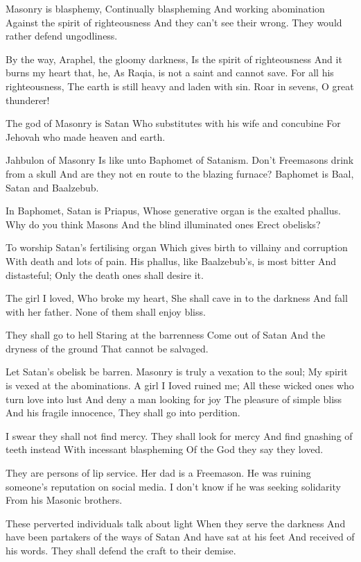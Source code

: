 \documentclass[
]{book}
\begin{document}
Masonry is blasphemy,
Continually blaspheming
And working abomination
Against the spirit of righteousness
And they can't see their wrong.
They would rather defend ungodliness.

By the way, Araphel, the gloomy darkness,
Is the spirit of righteousness
And it burns my heart that, he,
As Raqia, is not a saint and cannot save.
For all his righteousness,
The earth is still heavy and laden with sin.
Roar in sevens, O great thunderer!

The god of Masonry is Satan
Who substitutes with his wife and concubine
For Jehovah who made heaven and earth.

Jahbulon of Masonry
Is like unto Baphomet of Satanism.
Don't Freemasons drink from a skull
And are they not en route to the blazing furnace?
Baphomet is Baal, Satan and Baalzebub.

In Baphomet, Satan is Priapus,
Whose generative organ is the exalted phallus.
Why do you think Masons
And the blind illuminated ones
Erect obelisks?

To worship Satan's fertilising organ
Which gives birth to villainy and corruption
With death and lots of pain.
His phallus, like Baalzebub's, is most bitter
And distasteful;
Only the death ones shall desire it.

The girl I loved,
Who broke my heart,
She shall cave in to the darkness
And fall with her father.
None of them shall enjoy bliss.

They shall go to hell
Staring at the barrenness
Come out of Satan
And the dryness of the ground
That cannot be salvaged.

Let Satan's obelisk be barren.
Masonry is truly a vexation to the soul;
My spirit is vexed at the abominations.
A girl I Ioved ruined me;
All these wicked ones who turn love into lust
And deny a man looking for joy
The pleasure of simple bliss
And his fragile innocence,
They shall go into perdition.

I swear they shall not find mercy.
They shall look for mercy
And find gnashing of teeth instead
With incessant blaspheming
Of the God they say they loved.

They are persons of lip service.
Her dad is a Freemason.
He was ruining someone's reputation on social media.
I don't know if he was seeking solidarity
From his Masonic brothers.

These perverted individuals talk about light
When they serve the darkness
And have been partakers of the ways of Satan
And have sat at his feet
And received of his words.
They shall defend the craft to their demise.
\end{document}
